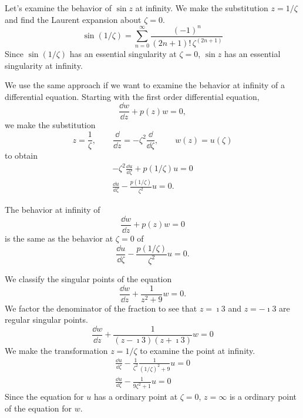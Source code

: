 \begin{Example}
  Let's examine the behavior of $\sin z$ at infinity.  We make the substitution
  $z = 1/\zeta$ and find the Laurent expansion about $\zeta=0$.
  \[
  \sin(1/\zeta) = \sum_{n=0}^\infty \frac{(-1)^n}{(2n+1)! \, \zeta^{(2n+1)}}
  \]
  Since $\sin(1/\zeta)$ has an essential singularity at $\zeta=0$,
  $\sin z$ has an essential singularity at infinity.
\end{Example}




We use the same approach if we want to examine the behavior at infinity of a 
differential equation.  Starting with the first order differential equation,
\[ 
\frac{\dd w}{\dd z} + p(z) w = 0,
\]
we make the substitution
\[ 
z = \frac{1}{\zeta}, \qquad \frac{\dd}{\dd z} = -\zeta^2 \frac{\dd}{\dd \zeta}, 
\qquad w(z) = u(\zeta) 
\]
to obtain
\begin{gather*}
  -\zeta^2 \frac{\dd u}{\dd \zeta} + p(1/\zeta) u = 0 \\
  \frac{\dd u}{\dd \zeta} - \frac{p(1/\zeta)}{\zeta^2} u = 0.
\end{gather*}




\begin{Result}
  The behavior at infinity of
  \[ 
  \frac{\dd w}{\dd z} + p(z) w = 0
  \]
  is the same as the behavior at $\zeta=0$ of
  \[
  \frac{\dd u}{\dd \zeta} - \frac{p(1/\zeta)}{\zeta^2} u = 0.
  \]
\end{Result}






\begin{Example}
  We classify the singular points of the equation
  \[
  \frac{\dd w}{\dd z} + \frac{1}{z^2 + 9} w = 0.
  \]
  We factor the denominator of the fraction 
  to see that $z = \imath 3$ and $z = - \imath 3$ are regular singular points.  
  \[
  \frac{\dd w}{\dd z} + \frac{1}{(z - \imath 3)(z + \imath 3)} w = 0
  \]
  We make the transformation $z = 1 / \zeta$ to examine the point at infinity.
  \begin{gather*}
    \frac{\dd u}{\dd \zeta} - \frac{1}{\zeta^2}\frac{1}{(1/\zeta)^2+9} u = 0 
    \\
    \frac{\dd u}{\dd \zeta} - \frac{1}{9 \zeta^2 + 1} u = 0 
  \end{gather*}
  Since the equation for $u$ has a ordinary point at $\zeta = 0$, 
  $z = \infty$ is a ordinary point of the equation for $w$.
\end{Example}






















